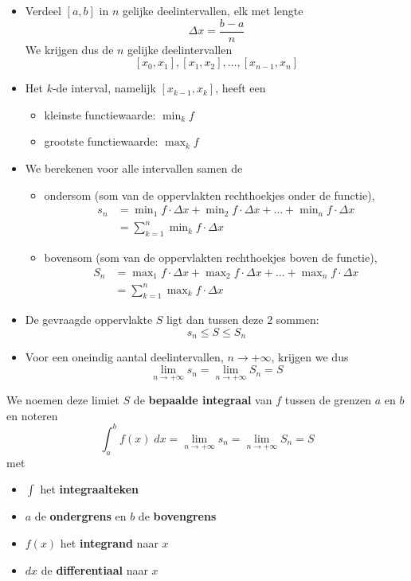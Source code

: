 \documentclass[a4paper,12pt]{article}
\begin{document}
\begin{itemize}
  \item Verdeel $[a,b]$ in $n$ gelijke deelintervallen, elk met lengte
  $$\Delta x=\dfrac{b-a}{n}$$
  We krijgen dus de $n$ gelijke deelintervallen
  $$[x_0, x_1],[x_1, x_2],\ldots,[x_{n-1}, x_{n}]$$
  \item Het $k$-de interval, namelijk $[x_{k-1},x_{k}]$, heeft een
  \begin{itemize}
    \item kleinste functiewaarde: $\min_k f$
    \item grootste functiewaarde: $\max_k f$
  \end{itemize}
  \item We berekenen voor alle intervallen samen de
  \begin{itemize}
    \item ondersom (som van de oppervlakten rechthoekjes onder de functie),
    \begin{align*}
      s_n &= \min\nolimits_1 f\cdot \Delta x + \min\nolimits_2 f\cdot \Delta x + \ldots + \min\nolimits_n f\cdot \Delta x\\
          &= \sum_{k=1}^n \min\nolimits_k f\cdot\Delta x
    \end{align*}
    \item bovensom (som van de oppervlakten rechthoekjes boven de functie),
    \begin{align*}
      S_n &= \max\nolimits_1 f\cdot \Delta x + \max\nolimits_2 f\cdot \Delta x + \ldots + \max\nolimits_n f\cdot \Delta x\\
          &= \sum_{k=1}^n \max\nolimits_k f\cdot\Delta x
    \end{align*}
  \end{itemize}
  \item De gevraagde oppervlakte $S$ ligt dan tussen deze 2 sommen:
  $$s_n \leq S \leq S_n$$
  \item Voor een oneindig aantal deelintervallen, $n\to+\infty$, krijgen we dus
  $$\lim_{n\to+\infty}s_n = \lim_{n\to+\infty}S_n = S$$
\end{itemize}

We noemen deze limiet $S$ de {\bf bepaalde integraal} van $f$ tussen de grenzen $a$ en $b$ en noteren
$$\int_a^b f(x)\;dx = \lim_{n\to+\infty}s_n = \lim_{n\to+\infty}S_n = S$$
met
\begin{itemize}
  \item $\displaystyle\int$ het {\bf integraalteken}
  \item $a$ de {\bf ondergrens} en $b$ de {\bf bovengrens}
  \item $f(x)$ het {\bf integrand} naar $x$
  \item $dx$ de {\bf differentiaal} naar $x$
\end{itemize}
\end{document}
